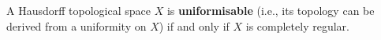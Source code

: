 A Hausdorff topological space $X$ is \textbf{uniformisable} (i.e., its topology can be derived from a uniformity on $X$) if and only if $X$ is completely regular.
